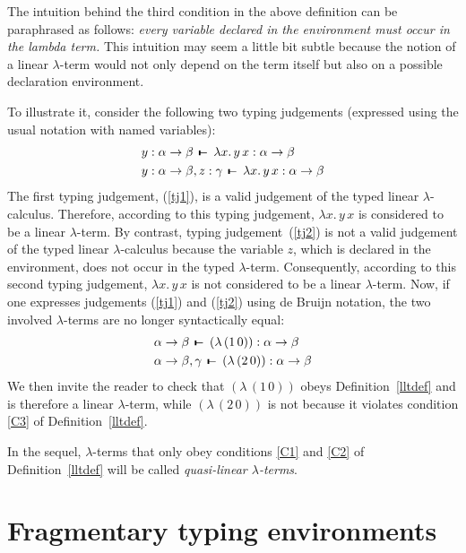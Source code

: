 \documentclass[submission,creativecommons]{eptcs}
\def\joinrelm{\mathrel{\mkern-3mu}}
\def\relbar{\mathrel{\smash-}}
\def\tailpiece{\mathchoice
  {\vrule height 1ex width 0.3ex depth -.1ex}%
  {\vrule height 1ex width 0.3ex depth -.1ex}%
  {\vrule height 0.7ex width 0.3ex depth -.1ex}%
  {\vrule height 0.7ex width 0.3ex depth -.1ex}}
\def\seqsym{\mathrel{\tailpiece\joinrelm\relbar}}
\newcommand{\iabs}[1]{(\lambda\,#1)}
\newcommand{\iapp}[2]{(#1\,#2)}
\newcommand{\tseq}[3]{#1 \, \seqsym \, #2 : #3}
\begin{document}
The intuition behind the third condition in the above definition can be paraphrased as follows:
\textit{every variable declared in the environment must occur in the lambda term.}
This intuition may seem a little bit subtle because the notion of a linear $\lambda$-term would not only depend
on the term itself but also on a possible declaration environment.

To illustrate it, consider the following two typing judgements (expressed using the usual notation with named
variables):
\begin{align}
&\tseq{y:\alpha\rightarrow\beta}{\lambda x.\,y\,x}{\alpha\rightarrow\beta}\label{tj1}\\
&\tseq{y:\alpha\rightarrow\beta, z:\gamma}{\lambda x.\,y\,x}{\alpha\rightarrow\beta}\label{tj2}
\end{align}
The first typing judgement, (\ref{tj1}), is a valid judgement of the typed linear $\lambda$-calculus.
Therefore, according to this typing judgement, $\lambda x.\,y\,x$ is considered to be a linear $\lambda$-term.
By contrast, typing judgement~(\ref{tj2}) is not a valid judgement of the typed linear $\lambda$-calculus because
the variable $z$, which is declared in the environment, does not occur in the typed $\lambda$-term.
Consequently, according to this second typing judgement, $\lambda x.\,y\,x$ is not considered to be a linear
$\lambda$-term.
Now, if one expresses judgements (\ref{tj1}) and (\ref{tj2}) using de Bruijn notation, the two involved
$\lambda$-terms are no longer syntactically equal:
\begin{align}
&\tseq{\alpha\rightarrow\beta}{\iabs{\iapp{1}{0}}}{\alpha\rightarrow\beta}\label{tjdb1}\\
&\tseq{\alpha\rightarrow\beta, \gamma}{\iabs{\iapp{2}{0}}}{\alpha\rightarrow\beta}\label{tjdb2}
\end{align}
We then invite the reader to check that $\iabs{\iapp{1}{0}}$ obeys Definition~\ref{lltdef} and is therefore a
linear $\lambda$-term, while $\iabs{\iapp{2}{0}}$ is not because it violates condition \ref{C3}
of Definition~\ref{lltdef}.

In the sequel, $\lambda$-terms that only obey conditions \ref{C1} and \ref{C2} of Definition~\ref{lltdef} will
be called \emph{quasi-linear $\lambda$-terms}.

\section{Fragmentary typing environments}
\end{document}
